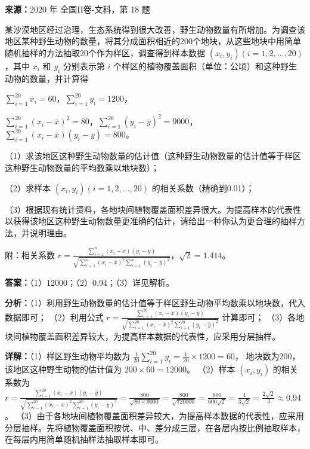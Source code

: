 \begin{question}[points=12]
\textbf{来源：}2020 年 全国II卷-文科，第 18 题\par
某沙漠地区经过治理，生态系统得到很大改善，野生动物数量有所增加。为调查该地区某种野生动物的数量，将其分成面积相近的200个地块，从这些地块中用简单随机抽样的方法抽取20个作为样区，调查得到样本数据 $(x_i,y_i)(i=1,2,\ldots,20)$，其中 $x_i$ 和 $y_i$ 分别表示第 $i$ 个样区的植物覆盖面积（单位：公顷）和这种野生动物的数量，并计算得

$\sum_{i=1}^{20}x_i=60$，$\sum_{i=1}^{20}y_i=1200$，

$\sum_{i=1}^{20}(x_i-\bar{x})^2=80$，$\sum_{i=1}^{20}(y_i-\bar{y})^2=9000$，$\sum_{i=1}^{20}(x_i-\bar{x})(y_i-\bar{y})=800$。

（1）求该地区这种野生动物数量的估计值（这种野生动物数量的估计值等于样区这种野生动物数量的平均数乘以地块数）；

（2）求样本 $(x_i,y_i)(i=1,2,\ldots,20)$ 的相关系数（精确到0.01）；

（3）根据现有统计资料，各地块间植物覆盖面积差异很大。为提高样本的代表性以获得该地区这种野生动物数量更准确的估计，请给出一种你认为更合理的抽样方法，并说明理由。

附：相关系数 $r=\frac{\sum_{i=1}^{n}(x_i-\bar{x})(y_i-\bar{y})}{\sqrt{\sum_{i=1}^{n}(x_i-\bar{x})^2\sum_{i=1}^{n}(y_i-\bar{y})^2}}$，$\sqrt{2}=1.414$。
\begin{solution}
\textbf{答案：}（1）12000；（2）0.94；（3）详见解析。

\textbf{分析：}（1）利用野生动物数量的估计值等于样区野生动物平均数乘以地块数，代入数据即可；
（2）利用公式 $r=\frac{\sum_{i=1}^{20}(x_i-\bar{x})(y_i-\bar{y})}{\sqrt{\sum_{i=1}^{20}(x_i-\bar{x})^2\sum_{i=1}^{20}(y_i-\bar{y})^2}}$ 计算即可；
（3）各地块间植物覆盖面积差异较大，为提高样本数据的代表性，应采用分层抽样。

\textbf{详解：}（1）样区野生动物平均数为 $\frac{1}{20}\sum_{i=1}^{20}y_i = \frac{1}{20}\times1200=60$，
地块数为200，该地区这种野生动物的估计值为 $200\times60=12000$。
（2）样本 $(x_i,y_i)$ 的相关系数为
$r = \frac{\sum_{i=1}^{20}(x_i-\bar{x})(y_i-\bar{y})}{\sqrt{\sum_{i=1}^{20}(x_i-\bar{x})^2\sum_{i=1}^{20}(y_i-\bar{y})^2}} = \frac{800}{\sqrt{80\times9000}} = \frac{800}{\sqrt{720000}} = \frac{800}{600\sqrt{2}} = \frac{4}{3\sqrt{2}} = \frac{2\sqrt{2}}{3} \approx 0.94$。
（3）由于各地块间植物覆盖面积差异较大，为提高样本数据的代表性，应采用分层抽样。先将植物覆盖面积按优、中、差分成三层，在各层内按比例抽取样本，在每层内用简单随机抽样法抽取样本即可。
\end{solution}
\end{question}

